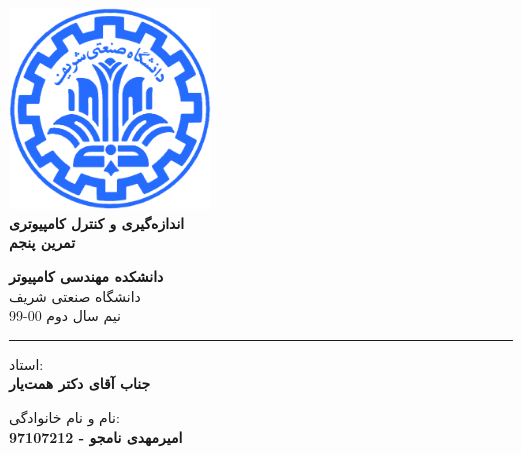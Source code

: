 \documentclass[12pt]{article}
\begin{document}
\begin{titlepage}
\begin{center}
        
\vspace*{0.7cm}

\includegraphics[width=0.4\textwidth]{sharif1.png}\\
\vspace{0.5cm}
\textbf{ \Huge{\emph ‌اندازه‌گیری و کنترل کامپیوتری} }\\
\vspace{0.5cm}
\textbf{ \Large{ تمرین پنجم} }
\vspace{0.2cm}
       
 
      \large \textbf{دانشکده مهندسی کامپیوتر}\\\vspace{0.2cm}
    \large   دانشگاه صنعتی شریف\\\vspace{0.2cm}
       \large   ﻧﯿﻢ سال دوم 00-99 \\\vspace{0.2cm}
      \noindent\rule[1ex]{\linewidth}{1pt}
استاد:\\
    \textbf{{جناب آقای دکتر همت‌یار}}


    \vspace{0.15cm}
نام و نام خانوادگی:\\

       
    \textbf{{امیرمهدی نامجو - 97107212}}
\end{center}
\end{titlepage}


\newpage
\pagestyle{fancy}
\fancyhf{}
\fancyfoot{}
\cfoot{\thepage}
\end{document}
